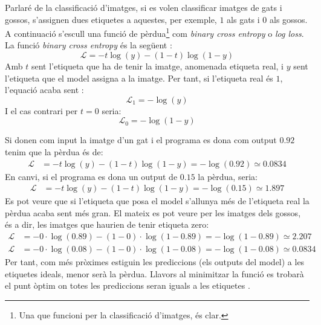 Parlaré de la classificació d'imatges, si es volen classificar imatges de gats i gossos, s'assignen dues etiquetes a aquestes, per exemple, $1$ als gats i $0$ als gossos. A continuació s'escull una funció de pèrdua\footnote{Una que funcioni per la classificació d'imatges, és clar.} com \textit{binary cross entropy} o \textit{log loss}. La funció \textit{binary cross entropy} és la següent \cite{crossentropy}:
\begin{equation}
	\mathcal{L} = - t\log(y) - (1 - t)\log(1 - y) 
	\label{eq:BCE}
\end{equation}
Amb $t$ sent l'etiqueta que ha de tenir la imatge, anomenada etiqueta real, i $y$ sent l'etiqueta que el model assigna a la imatge. Per tant, si l'etiqueta real és $1$, l'equació acaba sent \cite{crossentropy}:
$$
\mathcal{L}_1 = - \log(y)
$$
I el cas contrari per $t = 0$ seria:
$$
\mathcal{L}_0 = - \log(1 - y)
$$

Si donen com input la imatge d'un gat i el programa es dona com output $0.92$ tenim que la pèrdua és de:
\begin{align*}
	\mathcal{L} &= - t\log(y) - (1 - t)\log(1 - y) = - \log(0.92) \simeq 0.0834
\end{align*}
En canvi, si el programa es dona un output de $0.15$ la pèrdua, seria:
\begin{align*}
	\mathcal{L} &= - t\log(y) - (1 - t)\log(1 - y) = - \log(0.15) \simeq 1.897
\end{align*}
Es pot veure que si l'etiqueta que posa el model s'allunya més de l'etiqueta real la pèrdua acaba sent més gran. El mateix es pot veure per les imatges dels gossos, és a dir, les imatges que haurien de tenir etiqueta zero:
\begin{align*}
	\mathcal{L} &= - 0\cdot\log(0.89) - (1 - 0)\cdot\log(1 - 0.89) = - \log(1- 0.89) \simeq 2.207 \\
	\mathcal{L} &= - 0\cdot\log(0.08) - (1 - 0)\cdot\log(1 - 0.08) = - \log(1- 0.08)\simeq 0.0834
\end{align*}
Per tant, com més pròximes estiguin les prediccions (els outputs del model) a les etiquetes ideals, menor serà la pèrdua. Llavors al minimitzar la funció es trobarà el punt òptim on totes les prediccions seran iguals a les etiquetes \cite{DL:minmax}.

